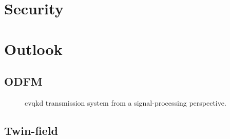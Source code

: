 \section{Security}

\section{Outlook}

\subsection{ODFM}

\begin{figure}[htb]
	\centering
	
	\caption{\Gls{cvqkd} transmission system from a signal-processing perspective.}
\end{figure}

\subsection{Twin-field}
